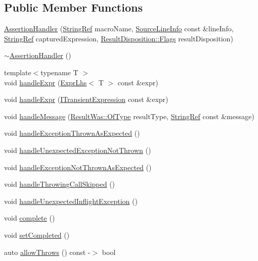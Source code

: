\subsection*{Public Member Functions}
\begin{DoxyCompactItemize}
\item 
\hyperlink{class_catch_1_1_assertion_handler_a74627e1e399b026e9acbaf95ea673643}{Assertion\-Handler} (\hyperlink{class_catch_1_1_string_ref}{String\-Ref} macro\-Name, \hyperlink{struct_catch_1_1_source_line_info}{Source\-Line\-Info} const \&line\-Info, \hyperlink{class_catch_1_1_string_ref}{String\-Ref} captured\-Expression, \hyperlink{struct_catch_1_1_result_disposition_a3396cad6e2259af326b3aae93e23e9d8}{Result\-Disposition\-::\-Flags} result\-Disposition)
\item 
\hyperlink{class_catch_1_1_assertion_handler_a1e839d810f6ac0fa6d127fe8350175ed}{$\sim$\-Assertion\-Handler} ()
\item 
{\footnotesize template$<$typename T $>$ }\\void \hyperlink{class_catch_1_1_assertion_handler_a2ef387e567bad90ec6e4b5bf5c367388}{handle\-Expr} (\hyperlink{class_catch_1_1_expr_lhs}{Expr\-Lhs}$<$ T $>$ const \&expr)
\item 
void \hyperlink{class_catch_1_1_assertion_handler_afe14d9cf1b1c7f70dae439fbdb51d0c4}{handle\-Expr} (\hyperlink{struct_catch_1_1_i_transient_expression}{I\-Transient\-Expression} const \&expr)
\item 
void \hyperlink{class_catch_1_1_assertion_handler_abdb4c180ed83ec2858b2fb87712c516d}{handle\-Message} (\hyperlink{struct_catch_1_1_result_was_a624e1ee3661fcf6094ceef1f654601ef}{Result\-Was\-::\-Of\-Type} result\-Type, \hyperlink{class_catch_1_1_string_ref}{String\-Ref} const \&message)
\item 
void \hyperlink{class_catch_1_1_assertion_handler_ab6caf765764a4064e90fce829eec201d}{handle\-Exception\-Thrown\-As\-Expected} ()
\item 
void \hyperlink{class_catch_1_1_assertion_handler_a7764d0adb6ed5eeb10964f6abc02fab1}{handle\-Unexpected\-Exception\-Not\-Thrown} ()
\item 
void \hyperlink{class_catch_1_1_assertion_handler_a51e4936e3af43b74690cedae6d2e297a}{handle\-Exception\-Not\-Thrown\-As\-Expected} ()
\item 
void \hyperlink{class_catch_1_1_assertion_handler_a67a194d5518f307c4a16faa03a7f7442}{handle\-Throwing\-Call\-Skipped} ()
\item 
void \hyperlink{class_catch_1_1_assertion_handler_aa2504dad6a91f3645e5f52c932c11270}{handle\-Unexpected\-Inflight\-Exception} ()
\item 
void \hyperlink{class_catch_1_1_assertion_handler_a878a9eb828d8a1863c8dcb6575f6f40e}{complete} ()
\item 
void \hyperlink{class_catch_1_1_assertion_handler_a6756bd5395c0ddd28764a9fb4612d5e4}{set\-Completed} ()
\item 
auto \hyperlink{class_catch_1_1_assertion_handler_a193bb3999494c46457f3059184c6b251}{allow\-Throws} () const -\/$>$ bool
\end{DoxyCompactItemize}

